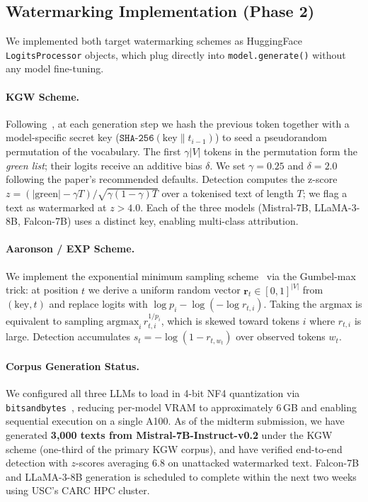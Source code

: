 \documentclass[11pt]{article}
\begin{document}
\subsection{Watermarking Implementation (Phase 2)}

We implemented both target watermarking schemes as HuggingFace
\texttt{LogitsProcessor} objects, which plug directly into
\texttt{model.generate()} without any model fine-tuning.

\paragraph{KGW Scheme.}
Following~\citet{kirchenbauer2023watermark}, at each generation step we hash
the previous token together with a model-specific secret key
($\texttt{SHA-256}(\text{key} \| t_{i-1})$) to seed a pseudorandom permutation
of the vocabulary.  The first $\gamma|V|$ tokens in the permutation form the
\emph{green list}; their logits receive an additive bias $\delta$.  We set
$\gamma = 0.25$ and $\delta = 2.0$ following the paper's recommended defaults.
Detection computes the z-score
$z = (|\text{green}| - \gamma T) / \sqrt{\gamma(1-\gamma)T}$
over a tokenised text of length $T$; we flag a text as watermarked at
$z > 4.0$.  Each of the three models (Mistral-7B, LLaMA-3-8B, Falcon-7B) uses
a distinct key, enabling multi-class attribution.

\paragraph{Aaronson / EXP Scheme.}
We implement the exponential minimum sampling scheme~\cite{aaronson2022watermark}
via the Gumbel-max trick: at position $t$ we derive a uniform random vector
$\mathbf{r}_t \in [0,1]^{|V|}$ from $(\text{key}, t)$ and replace logits with
$\log p_i - \log(-\log r_{t,i})$.  Taking the argmax is equivalent to sampling
$\text{argmax}_i\, r_{t,i}^{1/p_i}$, which is skewed toward tokens $i$ where
$r_{t,i}$ is large.  Detection accumulates
$s_t = -\log(1 - r_{t,w_t})$ over observed tokens $w_t$.

\paragraph{Corpus Generation Status.}
We configured all three LLMs to load in 4-bit NF4 quantization via
\texttt{bitsandbytes}~\cite{dettmers2022llmint8}, reducing per-model VRAM to
approximately 6\,GB and enabling sequential execution on a single A100.  As of
the midterm submission, we have generated \textbf{3{,}000 texts from
Mistral-7B-Instruct-v0.2} under the KGW scheme (one-third of the primary KGW
corpus), and have verified end-to-end detection with $z$-scores averaging $6.8$
on unattacked watermarked text.  Falcon-7B and LLaMA-3-8B generation is
scheduled to complete within the next two weeks using USC's CARC HPC cluster.
\end{document}
